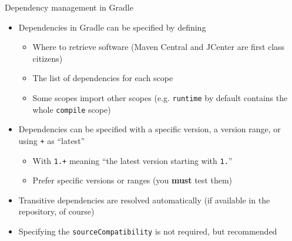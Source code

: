 \documentclass[presentation]{beamer}
\begin{document}
\begin{frame}[fragile]{Dependency management in Gradle}
	\begin{itemize}
		\item Dependencies in Gradle can be specified by defining
		\begin{itemize}
			\item Where to retrieve software (Maven Central and JCenter are first class citizens)
			\item The list of dependencies for each scope
			\item Some scopes import other scopes (e.g. \texttt{runtime} by default contains the whole \texttt{compile} scope)
		\end{itemize}
		\item Dependencies can be specified with a specific version, a version range, or using \texttt{+} as ``latest''
		\begin{itemize}
			\item With \texttt{1.+} meaning ``the latest version starting with \texttt{1.}''
			\item Prefer specific versions or ranges (you \textbf{must} test them)
		\end{itemize}
		\item Transitive dependencies are resolved automatically (if available in the repository, of course)
		\item Specifying the \texttt{sourceCompatibility} is not required, but recommended
	\end{itemize}
\end{frame}
\end{document}

